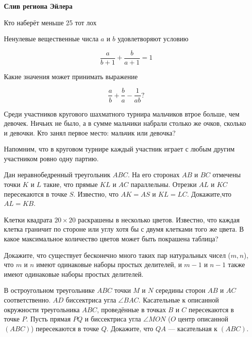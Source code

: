 \centerline{\bf \Huge Слив региона Эйлера}

\begin{flushright}
        \scriptsize{Кто наберёт меньше 25 тот лох}
\end{flushright}

Ненулевые вещественные числа $a$ и $b$ удовлетворяют условию

$$
\frac{a}{b+1}+\frac{b}{a+1}=1
$$


Какие значения может принимать выражение

$$
\frac{a}{b}+\frac{b}{a}-\frac{1}{a b} ?
$$

Среди участников кругового шахматного турнира мальчиков втрое больше, чем девочек. Ничьих не было, а в сумме мальчики набрали столько же очков, сколько и девочки. Кто занял первое место: мальчик или девочка?

Напомним, что в круговом турнире каждый участник играет с любым другим участником ровно одну партию.

Дан неравнобедренный треугольник $A B C$. На его сторонах $A B$ и $B C$ отмечены точки $K$ и $L$ такие, что прямые $K L$ и $A C$ параллельны. Отрезки $A L$ и $K C$ пересекаются в точке $S$. Известно, что $A K=A S$ и $K L=L C$. Докажите,что $A L=K B$.

Клетки квадрата $20 \times 20$ раскрашены в несколько цветов. Известно, что каждая клетка граничит по стороне или углу хотя бы с двумя клетками того же цвета. В какое максимальное количество цветов может быть покрашена таблица?

Докажите, что существует бесконечно много таких пар натуральных чисел ($m, n$), что $m$ и $n$ имеют одинаковые наборы простых делителей, и $m-1$ и $n-1$ также имеют одинаковые наборы простых делителей.


В остроугольном треугольнике $ABC$ точки $M$ и $N$ середины сторон $AB$ и $AC$ соответственно. $AD$ биссектриса угла $\angle BAC$. Касательные к описанной окружности треугольника $ABC$, проведённые в точках $B$ и $C$ пересекаются в точке $P$. Пусть прямая $PQ$ и биссектриса угла $\angle MON$ ($O$ центр описанной $(ABC)$) пересекаются в точке $Q$. Докажите, что $QA$ --- касательная к $(ABC)$.